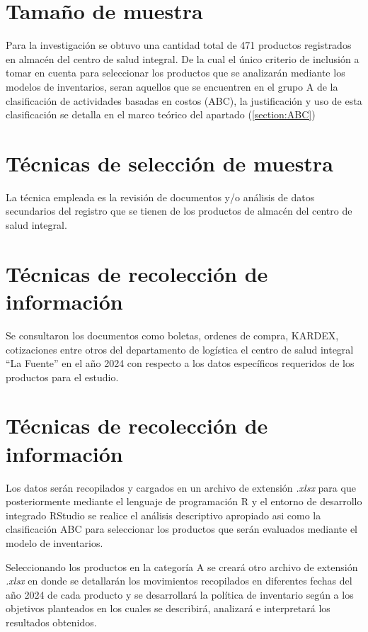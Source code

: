 \section{Tamaño de muestra}
Para la investigación se obtuvo una cantidad total de 471 productos registrados en almacén del centro de salud integral. De la cual el único criterio de inclusión a tomar en cuenta para seleccionar los productos que se analizarán mediante los modelos de inventarios, seran aquellos que se encuentren en el grupo A de la clasificación de actividades basadas en costos (ABC), la justificación y uso de esta clasificación se detalla en el marco teórico del apartado (\ref{section:ABC})

\section{Técnicas de selección de muestra}
La técnica empleada es la revisión de documentos y/o análisis de datos secundarios del registro que se tienen de los productos de almacén del centro de salud integral.

\section{Técnicas de recolección de información}
Se consultaron los documentos como boletas, ordenes de compra, KARDEX, cotizaciones entre otros del departamento de logística el centro de salud integral ``La Fuente'' en el año 2024 con respecto a los datos específicos requeridos de los productos para el estudio.

\section{Técnicas de recolección de información}
Los datos serán recopilados y cargados en un archivo de extensión \textsl{.xlsx} para que posteriormente mediante el lenguaje de programación R y el entorno de desarrollo integrado RStudio se realice el análisis descriptivo apropiado asi como la clasificación ABC para seleccionar los productos que serán evaluados mediante el modelo de inventarios.

Seleccionando los productos en la categoría A se creará otro archivo de extensión \textsl{.xlsx} en donde se detallarán los movimientos recopilados en diferentes fechas del año 2024 de cada producto y se desarrollará la política de inventario según a los objetivos planteados en los cuales se describirá, analizará e interpretará los resultados obtenidos.

